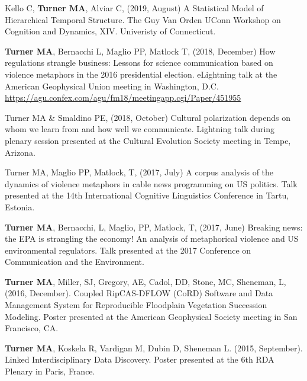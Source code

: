 \documentclass[letterpaper,11pt,oneside]{article}
\begin{document}
  \begin{hangparas}{0.25in}{1}
   Kello C, \textbf{Turner MA}, Alviar C, (2019, August) A Statistical Model of Hierarchical Temporal Structure. The Guy Van Orden UConn Workshop on Cognition and Dynamics, XIV. Univeristy of Connecticut.

\textbf{Turner MA}, Bernacchi L, Maglio PP, Matlock T, (2018, December) How regulations strangle business: Lessons for science communication based on violence metaphors in the 2016 presidential election. eLightning talk at the American Geophysical Union meeting in Washington, D.C. \url{https://agu.confex.com/agu/fm18/meetingapp.cgi/Paper/451955}

Turner MA \& Smaldino PE, (2018, October) Cultural polarization depends on whom we learn from and how well we communicate. Lightning talk during plenary session presented at the Cultural Evolution Society meeting in Tempe, Arizona.

Turner MA, Maglio PP, Matlock, T, (2017, July) A corpus analysis of the dynamics of violence metaphors in cable news programming on US politics. Talk presented at the 14th International Cognitive Linguistics Conference in Tartu, Estonia.

\textbf{Turner MA}, Bernacchi, L, Maglio, PP, Matlock, T, (2017, June) Breaking news: the EPA is strangling the economy! An analysis of metaphorical violence and US environmental regulators. Talk presented at the 2017 Conference on Communication and the Environment.

\textbf{Turner MA}, Miller, SJ, Gregory, AE, Cadol, DD, Stone, MC, Sheneman, L, (2016, December). Coupled RipCAS-DFLOW (CoRD) Software and Data Management System for Reproducible Floodplain Vegetation Succession Modeling. Poster presented at the American Geophysical Society meeting in San Francisco, CA.

\textbf{Turner MA}, Koskela R, Vardigan M, Dubin D, Sheneman L. (2015, September). Linked Interdisciplinary Data Discovery. Poster presented at the 6th RDA Plenary in Paris, France. 
  \end{hangparas}


\end{document}
